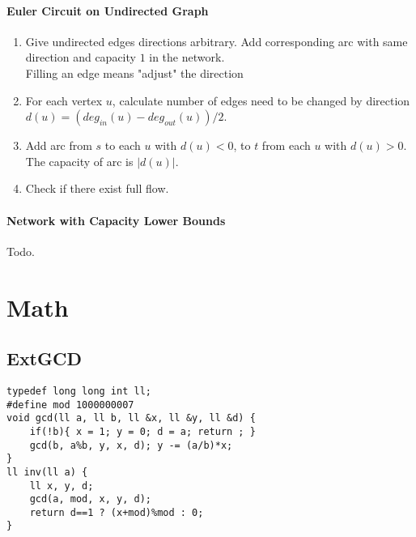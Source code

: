 \paragraph{Euler Circuit on Undirected Graph}
\begin{enumerate}
\item Give undirected edges directions arbitrary. Add corresponding arc with same direction and capacity $1$ in the network. \\
Filling an edge means "adjust" the direction
\item For each vertex $u$, calculate number of edges need to be changed by direction $d(u) = (deg_{in}(u) - deg_{out}(u))/2$.
\item Add arc from $s$ to each $u$ with $d(u)<0$, to $t$ from each $u$ with $d(u)>0$. The capacity of arc is $|d(u)|$.
\item Check if there exist full flow.
\end{enumerate}
\paragraph{Network with Capacity Lower Bounds} Todo.
\section{Math}
\subsection{ExtGCD}
\begin{lstlisting}
typedef long long int ll;
#define mod 1000000007
void gcd(ll a, ll b, ll &x, ll &y, ll &d) {
	if(!b){ x = 1; y = 0; d = a; return ; }
	gcd(b, a%b, y, x, d); y -= (a/b)*x;
}
ll inv(ll a) {
	ll x, y, d;
	gcd(a, mod, x, y, d);
	return d==1 ? (x+mod)%mod : 0;
}
\end{lstlisting}
